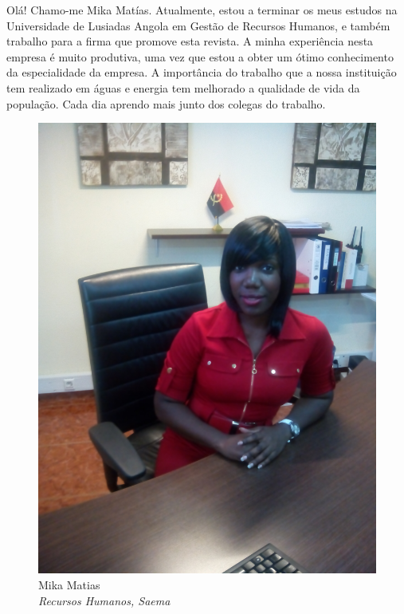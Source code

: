 \cappar Olá! Chamo-me Mika Matías. Atualmente, estou a terminar os meus estudos na Universidade de Lusiadas Angola em Gestão de Recursos Humanos, e também trabalho para a firma que promove esta revista. A minha experiência nesta empresa é muito produtiva, uma vez que estou a obter um ótimo conhecimento da especialidade da empresa. A importância do trabalho que a nossa instituição tem realizado em águas e energia tem melhorado a qualidade de vida da população. Cada dia aprendo mais junto dos colegas do trabalho.

\vspace{0.5cm}
\begin{figure} 
  \vspace{-25pt}
  \begin{figurebox}
   \vspace{20pt}
    \centering
    \includegraphics[height=0.5\textheight]{Mika.jpg}\\
    Mika Matias\\ 
     {\sl\small Recursos Humanos, Saema}
    \vspace{1pt}
  \end{figurebox}
 \vspace{-20pt}
\end{figure}

